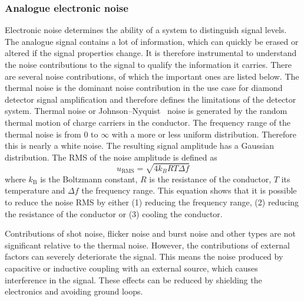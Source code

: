 \subsubsection{Analogue electronic noise}
Electronic noise determines the ability of a system to distinguish signal levels. The analogue signal contains a lot of information, which can quickly be erased or altered if the signal properties change. It is therefore instrumental to understand the noise contributions to the signal to qualify the information it carries. There are several noise contributions, of which the important ones are listed below. The thermal noise is the dominant noise contribution in the use case for diamond detector signal amplification and therefore defines the limitations of the detector system. Thermal noise or Johnson--Nyquist~\cite{} noise is generated by the random thermal motion of charge carriers in the conductor. The frequency range of the thermal noise is from 0 to $\infty$ with a more or less uniform distribution. Therefore this is nearly a white noise. The resulting signal amplitude has a Gaussian distribution. The RMS of the noise amplitude is defined as
\begin{equation}
\label{eq:thermnoise}
u_\mathrm{RMS}=\sqrt{4k_BRT\Delta f}
\end{equation}
where $k_\mathrm{B}$ is the Boltzmann constant, $R$ is the resistance of the conductor, $T$ its temperature and $\Delta f$ the frequency range. This equation shows that it is possible to reduce the noise RMS by either (1) reducing the frequency range, (2) reducing the resistance of the conductor or (3) cooling the conductor. 

Contributions of shot noise, flicker noise and burst noise and other types are not significant relative to the thermal noise. However, the contributions of external factors can severely deteriorate the signal. This means the noise produced by capacitive or inductive coupling with an external source, which causes interference in the signal. These effects can be reduced by shielding the electronics and avoiding ground loops. 


